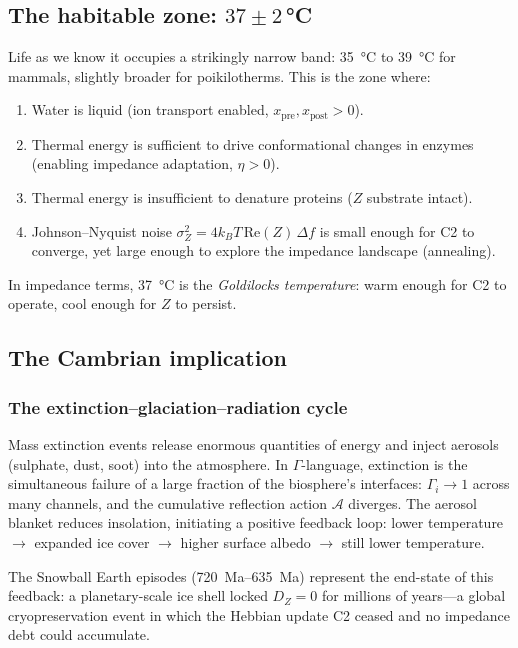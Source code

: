 \documentclass[aps,pre,twocolumn,superscriptaddress,floatfix]{revtex4-2}
\begin{document}
\subsection{The habitable zone: $37 \pm 2$\,°C}

Life as we know it occupies a strikingly narrow band:
\SI{35}{\celsius} to \SI{39}{\celsius} for mammals,
slightly broader for poikilotherms.
This is the zone where:
\begin{enumerate}
  \item Water is liquid (ion transport enabled,
    $x_{\text{pre}}, x_{\text{post}} > 0$).
  \item Thermal energy is sufficient to drive conformational
    changes in enzymes (enabling impedance adaptation,
    $\eta > 0$).
  \item Thermal energy is insufficient to denature proteins
    ($Z$ substrate intact).
  \item Johnson--Nyquist noise
    $\sigma_Z^2 = 4k_BT\,\text{Re}(Z)\,\Delta f$ is small
    enough for C2 to converge, yet large enough to explore
    the impedance landscape (annealing).
\end{enumerate}
In impedance terms, \SI{37}{\celsius} is the
\emph{Goldilocks temperature}: warm enough for C2 to operate,
cool enough for $Z$ to persist.

\subsection{The Cambrian implication}

\subsubsection{The extinction--glaciation--radiation cycle}

Mass extinction events release enormous quantities of
energy and inject aerosols (sulphate, dust, soot) into the
atmosphere.
In $\Gamma$-language, extinction is the simultaneous failure
of a large fraction of the biosphere's interfaces:
$\Gamma_i \to 1$ across many channels, and the cumulative
reflection action $\mathcal{A}$ diverges.
The aerosol blanket reduces insolation, initiating a
positive feedback loop: lower temperature $\to$ expanded ice
cover $\to$ higher surface albedo $\to$ still lower
temperature.

The Snowball Earth episodes (\SIrange{720}{635}{Ma})
represent the end-state of this feedback:
a planetary-scale ice shell locked $D_Z = 0$ for millions
of years---a global cryopreservation event in which the
Hebbian update C2 ceased and no impedance debt could
accumulate.
\end{document}
